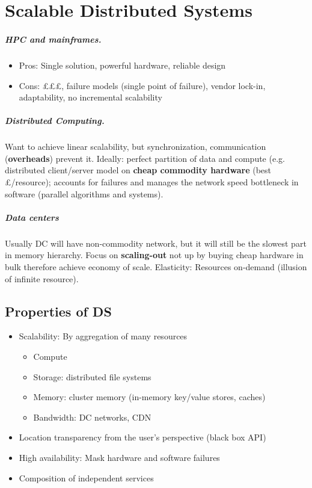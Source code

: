 \chapter{Scalable Distributed Systems}

\paragraph{
HPC and mainframes.
}
\begin{itemize}
\item Pros: Single solution, powerful hardware, reliable design
\item Cons: £££, failure models (single point of failure), vendor lock-in, adaptability, no incremental scalability
\end{itemize}

\paragraph{Distributed Computing.} Want to achieve linear scalability, but
synchronization, communication (\textbf{overheads}) prevent it. Ideally: perfect
partition of data and compute (e.g. distributed client/server model on \textbf{cheap commodity hardware} (best £/resource); accounts for failures and
manages the network speed bottleneck in software (parallel algorithms and
systems).

\paragraph{Data centers} Usually DC will have non-commodity network, but it will
still be the slowest part in memory hierarchy. Focus on \textbf{scaling-out} not up
by buying cheap hardware in bulk therefore achieve economy of scale. Elasticity:
Resources on-demand (illusion of infinite resource).

\section{Properties of DS}
\begin{itemize}
\item Scalability: By aggregation of many resources
  \begin{itemize}
  \item Compute
  \item Storage: distributed file systems
  \item Memory: cluster memory (in-memory key/value stores, caches)
  \item Bandwidth: DC networks, CDN
  \end{itemize}
  \item Location transparency from the user's perspective (black box API)
  \item High availability: Mask hardware and software failures
  \item Composition of independent services
\end{itemize}
